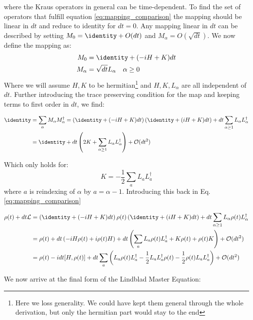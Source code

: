 where the Kraus operators in general can be time-dependent. To find the set of operators that fulfill equation \ref{eq:mapping_comparison} the mapping should be linear in $dt$ and reduce to identity for $dt = 0$. Any mapping linear in $dt$ can be described by setting $M_0 = \identity + O(dt)$ and $M_\alpha = O(\sqrt{dt})$. We now define the mapping as:
\begin{align}
    M_0 &= \identity + (-iH + K)dt \\
    M_\alpha &= \sqrt{dt} L_\alpha \quad \alpha \geq 0
\end{align}
Where we will assume $H, K$ to be hermitian\footnote{Here we loss generality. We could have kept them general through the whole derivation, but only the hermitian part would stay to the end} and $H, K, L_\alpha$ are all independent of $dt$. Further introducing the trace preserving condition for the map and keeping terms to first order in $dt$, we find:
\begin{fullwidth}
\begin{align}
    \identity &= \sum_\alpha M_\alpha M_\alpha^\dagger = \left(\identity + (-iH + K)dt\right)\left(\identity + (iH + K)dt\right) + dt \sum_{\alpha \geq 1} L_\alpha L_\alpha^\dagger \\
    &= \identity + dt \left(2K +  \sum_{\alpha\geq 1} L_\alpha L_\alpha^\dagger\right) + \mathcal{O}(dt^2) 
\end{align}
\end{fullwidth}
Which only holds for:
\begin{equation}
    K = - \frac12 \sum_a L_a L_a^\dagger
\end{equation}
where $a$ is reindexing of $\alpha$ by $a = \alpha - 1$. Introducing this back in Eq. \ref{eq:mapping_comparison} 
\begin{fullwidth}
\begin{align}
    \rho(t) + dt \lindbladian &= \left(\identity + (-iH + K)dt\right)\rho(t)\left(\identity + (iH + K)dt\right) + dt \sum_{\alpha \geq 1} L_\alpha \rho(t) L_\alpha^\dagger \\
    &= \rho(t) + dt \left(-i H \rho(t) + i \rho(t) H\right) + dt \left(\sum_a L_a \rho(t) L_a^\dagger + K \rho(t) + \rho(t) K\right) + \mathcal{O}(dt^2) \\
    &= \rho(t) -i dt[H, \rho(t)] + dt \sum_a \left(L_a \rho(t) L_a^\dagger - \frac12 L_a L_a^\dagger \rho(t) - \frac12 \rho(t)L_a L_a^\dagger  \right) + \mathcal{O}(dt^2)
\end{align}
\end{fullwidth}
We now arrive at the final form of the Lindblad Master Equation:
